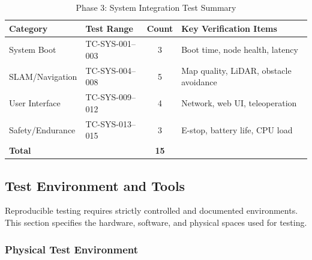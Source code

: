 \begin{table}[H]
    \centering
    \caption{Phase 3: System Integration Test Summary}
    \label{tab:phase3_summary}
    \begin{tabular}{@{}llcl@{}}
        \toprule
        \textbf{Category} & \textbf{Test Range} & \textbf{Count} & \textbf{Key Verification Items} \\
        \midrule
        System Boot & TC-SYS-001--003 & 3 & Boot time, node health, latency \\
        SLAM/Navigation & TC-SYS-004--008 & 5 & Map quality, LiDAR, obstacle avoidance \\
        User Interface & TC-SYS-009--012 & 4 & Network, web UI, teleoperation \\
        Safety/Endurance & TC-SYS-013--015 & 3 & E-stop, battery life, CPU load \\
        \midrule
        \textbf{Total} & & \textbf{15} & \\
        \bottomrule
    \end{tabular}
\end{table}

\subsection{Test Environment and Tools}
\label{subsec:test_env}

Reproducible testing requires strictly controlled and documented environments. This section specifies the hardware, software, and physical spaces used for testing.

\subsubsection{Physical Test Environment}

